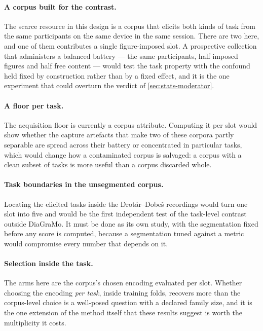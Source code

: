 \paragraph{A corpus built for the contrast.} The scarce resource in this design is a corpus that
elicits both kinds of task from the same participants on the same device in the same session. There
are two here, and one of them contributes a single figure-imposed slot. A prospective collection
that administers a balanced battery --- the same participants, half imposed figures and half free
content --- would test the task property with the confound held fixed by construction rather than by
a fixed effect, and it is the one experiment that could overturn the verdict of
\cref{sec:stats-moderator}.

\paragraph{A floor per task.} The acquisition floor is currently a corpus attribute. Computing it
per slot would show whether the capture artefacts that make two of these corpora partly separable
are spread across their battery or concentrated in particular tasks, which would change how a
contaminated corpus is salvaged: a corpus with a clean subset of tasks is more useful than a corpus
discarded whole.

\paragraph{Task boundaries in the unsegmented corpus.} Locating the elicited tasks inside the
Drot\'ar--Dobe\v{s} recordings would turn one slot into five and would be the first independent test
of the task-level contrast outside DiaGraMo. It must be done as its own study, with the
segmentation fixed before any score is computed, because a segmentation tuned against a metric would
compromise every number that depends on it.

\paragraph{Selection inside the task.} The arms here are the corpus's chosen encoding evaluated per
slot. Whether choosing the encoding \emph{per task}, inside training folds, recovers more than the
corpus-level choice is a well-posed question with a declared family size, and it is the one
extension of the method itself that these results suggest is worth the multiplicity it costs.
